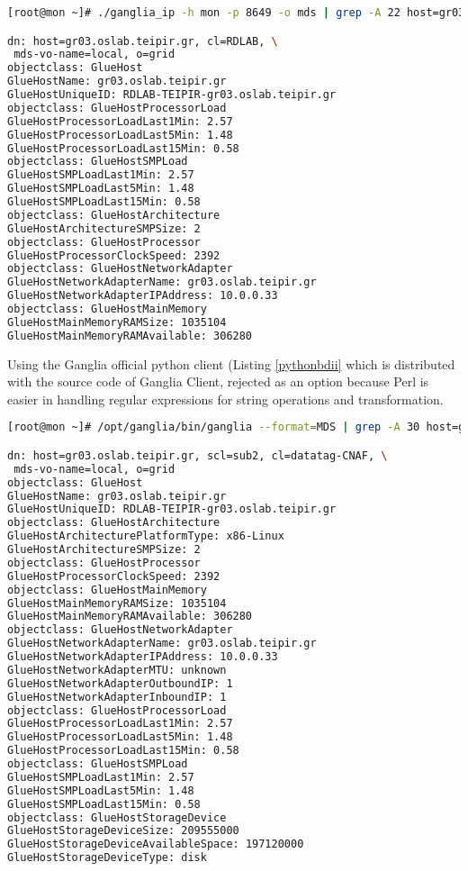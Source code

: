 \begin{lstlisting}[language=bash,caption=Perl Ganglia Information Provider for MDS,label=perlbdii]
[root@mon ~]# ./ganglia_ip -h mon -p 8649 -o mds | grep -A 22 host=gr03

dn: host=gr03.oslab.teipir.gr, cl=RDLAB, \
 mds-vo-name=local, o=grid
objectclass: GlueHost
GlueHostName: gr03.oslab.teipir.gr
GlueHostUniqueID: RDLAB-TEIPIR-gr03.oslab.teipir.gr
objectclass: GlueHostProcessorLoad
GlueHostProcessorLoadLast1Min: 2.57
GlueHostProcessorLoadLast5Min: 1.48
GlueHostProcessorLoadLast15Min: 0.58
objectclass: GlueHostSMPLoad
GlueHostSMPLoadLast1Min: 2.57
GlueHostSMPLoadLast5Min: 1.48
GlueHostSMPLoadLast15Min: 0.58
objectclass: GlueHostArchitecture
GlueHostArchitectureSMPSize: 2
objectclass: GlueHostProcessor
GlueHostProcessorClockSpeed: 2392
objectclass: GlueHostNetworkAdapter
GlueHostNetworkAdapterName: gr03.oslab.teipir.gr
GlueHostNetworkAdapterIPAddress: 10.0.0.33
objectclass: GlueHostMainMemory
GlueHostMainMemoryRAMSize: 1035104
GlueHostMainMemoryRAMAvailable: 306280
\end{lstlisting}

Using the Ganglia official python client (Listing \ref{pythonbdii} which is distributed with the source code of Ganglia Client, rejected as an option because Perl is easier in handling regular expressions for string operations and transformation.

\begin{lstlisting}[language=bash,caption=Python Ganglia client MDS export,label=pythonbdii]
[root@mon ~]# /opt/ganglia/bin/ganglia --format=MDS | grep -A 30 host=gr03

dn: host=gr03.oslab.teipir.gr, scl=sub2, cl=datatag-CNAF, \
 mds-vo-name=local, o=grid
objectclass: GlueHost
GlueHostName: gr03.oslab.teipir.gr
GlueHostUniqueID: RDLAB-TEIPIR-gr03.oslab.teipir.gr
objectclass: GlueHostArchitecture
GlueHostArchitecturePlatformType: x86-Linux
GlueHostArchitectureSMPSize: 2
objectclass: GlueHostProcessor
GlueHostProcessorClockSpeed: 2392
objectclass: GlueHostMainMemory
GlueHostMainMemoryRAMSize: 1035104
GlueHostMainMemoryRAMAvailable: 306280
objectclass: GlueHostNetworkAdapter
GlueHostNetworkAdapterName: gr03.oslab.teipir.gr
GlueHostNetworkAdapterIPAddress: 10.0.0.33
GlueHostNetworkAdapterMTU: unknown
GlueHostNetworkAdapterOutboundIP: 1
GlueHostNetworkAdapterInboundIP: 1
objectclass: GlueHostProcessorLoad
GlueHostProcessorLoadLast1Min: 2.57
GlueHostProcessorLoadLast5Min: 1.48
GlueHostProcessorLoadLast15Min: 0.58
objectclass: GlueHostSMPLoad
GlueHostSMPLoadLast1Min: 2.57
GlueHostSMPLoadLast5Min: 1.48
GlueHostSMPLoadLast15Min: 0.58
objectclass: GlueHostStorageDevice
GlueHostStorageDeviceSize: 209555000
GlueHostStorageDeviceAvailableSpace: 197120000
GlueHostStorageDeviceType: disk
\end{lstlisting}

